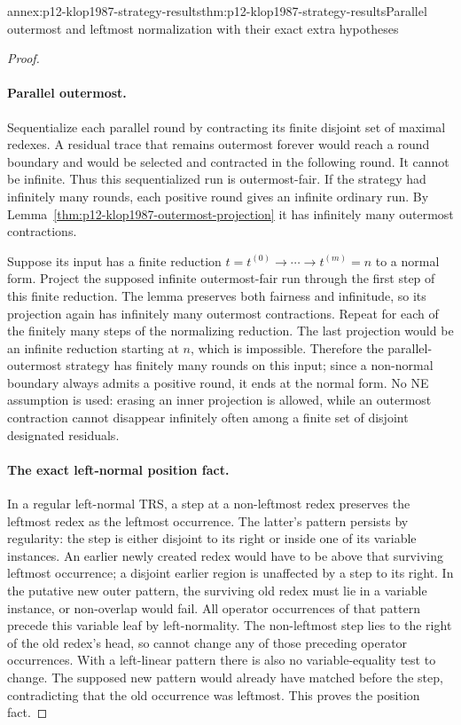 \begin{annexitem}{annex:p12-klop1987-strategy-results}{thm:p12-klop1987-strategy-results}{Parallel outermost and leftmost normalization with their exact extra hypotheses}
\begin{proof}
\paragraph{Parallel outermost.}
Sequentialize each parallel round by contracting its finite disjoint
set of maximal redexes. A residual trace that remains outermost forever
would reach a round boundary and would be selected and contracted in
the following round. It cannot be infinite. Thus this sequentialized
run is outermost-fair. If the strategy had infinitely many rounds, each
positive round gives an infinite ordinary run. By
Lemma~\ref{thm:p12-klop1987-outermost-projection} it has infinitely
many outermost contractions.

Suppose its input has a finite reduction
\(t=t^{(0)}\to\cdots\to t^{(m)}=n\) to a normal form.
Project the supposed infinite outermost-fair run through the first step
of this finite reduction. The lemma preserves both fairness and
infinitude, so its projection again has infinitely many outermost
contractions. Repeat for each of the finitely many steps of the
normalizing reduction. The last projection would be an infinite
reduction starting at \(n\), which is impossible. Therefore the
parallel-outermost strategy has finitely many rounds on this input;
since a non-normal boundary always admits a positive round, it ends
at the normal form. No NE assumption is used: erasing an inner
projection is allowed, while an outermost contraction cannot disappear
infinitely often among a finite set of disjoint designated residuals.

\paragraph{The exact left-normal position fact.}
In a regular left-normal TRS, a step at a non-leftmost redex preserves
the leftmost redex as the leftmost occurrence. The latter's pattern
persists by regularity: the step is either disjoint to its right or
inside one of its variable instances. An earlier newly created redex
would have to be above that surviving leftmost occurrence; a disjoint
earlier region is unaffected by a step to its right. In the putative
new outer pattern, the surviving old redex must lie in a variable
instance, or non-overlap would fail. All operator occurrences of that
pattern precede this variable leaf by left-normality. The non-leftmost
step lies to the right of the old redex's head, so cannot change any
of those preceding operator occurrences. With a left-linear pattern
there is also no variable-equality test to change. The supposed new
pattern would already have matched before the step, contradicting that
the old occurrence was leftmost. This proves the position fact.


\end{proof}
\end{annexitem}
